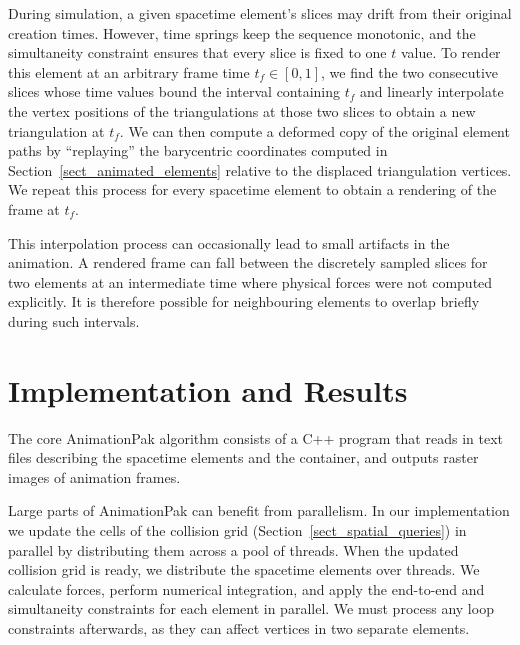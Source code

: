During simulation, a given spacetime element's slices may drift from their
original creation times.  However, time springs keep the sequence
monotonic, and the simultaneity constraint ensures that every slice
is fixed to one $t$ value.  To render this element at an arbitrary
frame time $t_f\in[0,1]$, we find the two consecutive slices whose
time values
bound the interval containing $t_f$ and linearly interpolate the vertex
positions of the triangulations at those two slices to obtain a new
triangulation at $t_f$.  We can then compute a deformed copy of the
original element paths by ``replaying'' the barycentric coordinates 
computed in Section~\ref{sect_animated_elements} relative to the displaced
triangulation vertices.  We repeat this process for every spacetime element
to obtain a rendering of the frame at $t_f$.

This interpolation process can occasionally lead to small artifacts in 
the animation.  A rendered frame can fall between
the discretely sampled slices for two elements at an intermediate time
where physical forces were not computed explicitly.  It is therefore
possible for neighbouring elements to overlap briefly during such intervals.


\section{Implementation and Results}
\label{animationpak_implementation_and_results}


The core AnimationPak algorithm consists of a C++ program that reads 
in text files describing the spacetime elements and the container, 
and outputs raster images of animation frames.

Large parts of AnimationPak can benefit from parallelism.  In
our implementation we update the cells of the collision grid
(Section~\ref{sect_spatial_queries}) in parallel by distributing them
across a pool of threads.  When the updated collision grid is ready,
we distribute the spacetime elements over threads.  We calculate
forces, perform numerical integration, and apply the end-to-end and
simultaneity constraints for each element in parallel.  We must
process any loop constraints afterwards, as they can affect vertices in
two separate elements.

